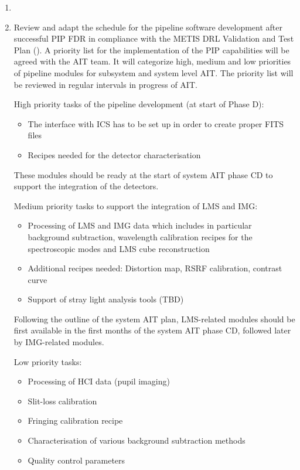 \begin{enumerate}
    \item 
    \item Review and adapt the schedule for the pipeline software development after successful PIP FDR in compliance with the METIS DRL Validation and Test Plan (\cite{DRLVT}). A priority list for the implementation of the PIP capabilities will be agreed with the AIT team. It will categorize high, medium and low priorities of pipeline modules for subsystem and system level AIT. The priority list will be reviewed in regular intervals in progress of AIT.
   
    High priority tasks of the pipeline development (at start of Phase D): 
    \begin{itemize}
        \item The interface with ICS has to be set up in order to create proper FITS files 
        \item Recipes needed for the detector characterisation
    \end{itemize} 
    These modules should be ready at the start of system AIT phase CD to support the integration of the detectors.
    
    Medium priority tasks to support the integration of LMS and IMG:
    \begin{itemize}
        \item Processing of LMS and IMG data which includes in particular background subtraction, wavelength calibration recipes for the spectroscopic modes and LMS cube reconstruction
        \item Additional recipes needed: Distortion map, RSRF calibration, contrast curve
        \item Support of stray light analysis tools (TBD)
    \end{itemize}
    Following the outline of the system AIT plan, LMS-related modules should be first available in the first months of the system AIT phase CD, followed later by IMG-related modules.

    Low priority tasks:
    \begin{itemize}
        \item Processing of HCI data (pupil imaging)
        \item Slit-loss calibration
        \item Fringing calibration recipe 
        \item Characterisation of various background subtraction methods
        \item Quality control parameters
    \end{itemize}
    

\end{enumerate}
